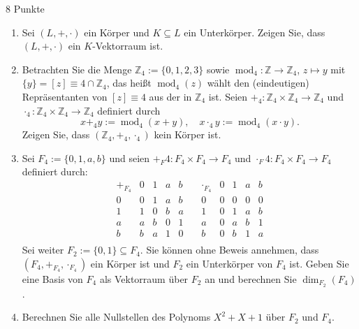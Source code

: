 \documentclass{problemset}
\begin{document}
\begin{problem}{8 Punkte}
\begin{enumerate}
    \item Sei $(L, +, \cdot)$ ein Körper und $K \subseteq L$ ein Unterkörper.
          Zeigen Sie, dass $(L, +, \cdot)$ ein $K$-Vektorraum ist.

    \item Betrachten Sie die Menge $\mathbb{Z}_4 := \{0, 1, 2, 3\}$ sowie
          $\operatorname{mod}_4 : \mathbb{Z} \to \mathbb{Z}_4$, $z \mapsto y$
          mit $\{y\} = [z] \equiv 4 \cap \mathbb{Z}_4$, das heißt
          $\operatorname{mod}_4(z)$ wählt den (eindeutigen) Repräsentanten von
          $[z] \equiv 4$ aus der in $\mathbb{Z}_4$ ist. Seien $+_4 :
          \mathbb{Z}_4 \times \mathbb{Z}_4 \to \mathbb{Z}_4$ und $\cdot_4 :
          \mathbb{Z}_4 \times \mathbb{Z}_4 \to \mathbb{Z}_4$ definiert durch
          \[ x +_4 y := \operatorname{mod}_4(x + y), \quad x \cdot_4 y := \operatorname{mod}_4(x \cdot y). \]
          Zeigen Sie, dass $(\mathbb{Z}_4, +_4, \cdot_4)$ kein Körper ist.

    \item Sei $F_4 := \{0, 1, a, b\}$ und seien $+_F4 : F_4 \times F_4 \to F_4$
          und $\cdot_F4 : F_4 \times F_4 \to F_4$ definiert durch:
          \[ \begin{array}{c|cccc}
                  +_{F_4} & 0 & 1 & a & b \\
                  \hline
                  0       & 0 & 1 & a & b \\
                  1       & 1 & 0 & b & a \\
                  a       & a & b & 0 & 1 \\
                  b       & b & a & 1 & 0 \\
              \end{array} \quad
              \begin{array}{c|cccc}
                  \cdot_{F_4} & 0 & 1 & a & b \\
                  \hline
                  0           & 0 & 0 & 0 & 0 \\
                  1           & 0 & 1 & a & b \\
                  a           & 0 & a & b & 1 \\
                  b           & 0 & b & 1 & a \\
              \end{array} \]
          Sei weiter $F_2 := \{0, 1\} \subseteq F_4$. Sie können ohne Beweis
          annehmen, dass $(F_4, +_{F_4}, \cdot_{F_4})$ ein Körper ist und $F_2$
          ein Unterkörper von $F_4$ ist. Geben Sie eine Basis von $F_4$ als
          Vektorraum über $F_2$ an und berechnen Sie $\dim_{F_2}(F_4)$.
    \item Berechnen Sie alle Nullstellen des Polynoms $X^2 + X + 1$ über $F_2$
          und $F_4$.
\end{enumerate}
\end{problem}
\end{document}
